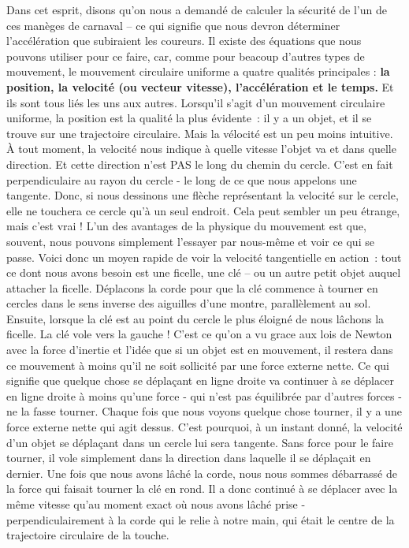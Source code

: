 \documentclass[a4paper, twoside]{article}
\begin{document}
Dans cet esprit, disons qu'on nous a demandé de calculer la sécurité de
l'un de ces manèges de carnaval -- ce qui signifie que nous devron
déterminer l'accélération que subiraient les coureurs. Il existe des
équations que nous pouvons utiliser pour ce faire, car, comme pour
beacoup d'autres types de mouvement, le mouvement circulaire uniforme a
quatre qualités principales : \textbf{la position, la velocité (ou
vecteur vitesse), l'accélération et le temps.} Et ils sont tous liés les
uns aux autres. Lorsqu'il s'agit d'un mouvement circulaire uniforme, la
position est la qualité la plus évidente~: il y a un objet, et il se
trouve sur une trajectoire circulaire. Mais la vélocité est un peu moins
intuitive. À tout moment, la velocité nous indique à quelle vitesse
l'objet va et dans quelle direction. Et cette direction n'est PAS le
long du chemin du cercle. C'est en fait perpendiculaire au rayon du
cercle - le long de ce que nous appelons une tangente. Donc, si nous
dessinons une flèche représentant la velocité sur le cercle, elle ne
touchera ce cercle qu'à un seul endroit. Cela peut sembler un peu
étrange, mais c'est vrai ! L'un des avantages de la physique du
mouvement est que, souvent, nous pouvons simplement l'essayer par
nous-même et voir ce qui se passe. Voici donc un moyen rapide de voir la
velocité tangentielle en action~: tout ce dont nous avons besoin est une
ficelle, une clé -- ou un autre petit objet auquel attacher la ficelle.
Déplacons la corde pour que la clé commence à tourner en cercles dans le
sens inverse des aiguilles d'une montre, parallèlement au sol. Ensuite,
lorsque la clé est au point du cercle le plus éloigné de nous lâchons la
ficelle. La clé vole vers la gauche ! C'est ce qu'on a vu grace aux lois
de Newton avec la force d'inertie et l'idée que si un objet est en
mouvement, il restera dans ce mouvement à moins qu'il ne soit sollicité
par une force externe nette. Ce qui signifie que quelque chose se
déplaçant en ligne droite va continuer à se déplacer en ligne droite à
moins qu'une force - qui n'est pas équilibrée par d'autres forces - ne
la fasse tourner. Chaque fois que nous voyons quelque chose tourner, il
y a une force externe nette qui agit dessus. C'est pourquoi, à un
instant donné, la velocité d'un objet se déplaçant dans un cercle lui
sera tangente. Sans force pour le faire tourner, il vole simplement dans
la direction dans laquelle il se déplaçait en dernier. Une fois que nous
avons lâché la corde, nous nous sommes débarrassé de la force qui
faisait tourner la clé en rond. Il a donc continué à se déplacer avec la
même vitesse qu'au moment exact où nous avons lâché prise -
perpendiculairement à la corde qui le relie à notre main, qui était le
centre de la trajectoire circulaire de la touche.
\end{document}
